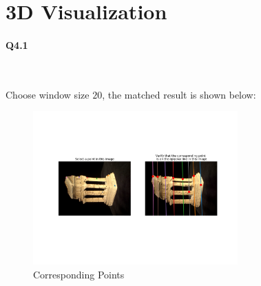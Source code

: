\documentclass[11pt]{article} \usepackage{fullpage} \usepackage{graphicx} \usepackage{epstopdf} \usepackage{color} \usepackage{psfrag} \usepackage{pdfsync}\usepackage{indentfirst}\usepackage{subfigure}\usepackage{float}\usepackage[section]{placeins}
\begin{document}
\section{3D Visualization}

\paragraph{Q4.1}~{}

Choose window size $20$, the matched result is shown below:
\begin{figure}[H]
\centering
\includegraphics[width=0.7\textwidth]{results/q4_1.png}
\caption{Corresponding Points}
\end{figure}
\end{document}

